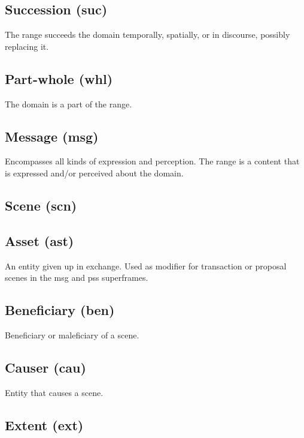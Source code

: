 \documentclass[a4paper]{article}
\begin{document}
\subsection{Succession (suc)}

The range succeeds the domain temporally, spatially, or in discourse, possibly replacing it.

\subsection{Part-whole (whl)}

The domain is a part of the range.

\subsection{Message (msg)}

Encompasses all kinds of expression and perception. The range is a content that is expressed and/or perceived about the domain.

\subsection{Scene (scn)}


\subsection{Asset (ast)}

An entity given up in exchange. Used as modifier for transaction or proposal scenes in the msg and pss superframes.

\subsection{Beneficiary (ben)}

Beneficiary or maleficiary of a scene.

\subsection{Causer (cau)}

Entity that causes a scene.

\subsection{Extent (ext)}
\end{document}

